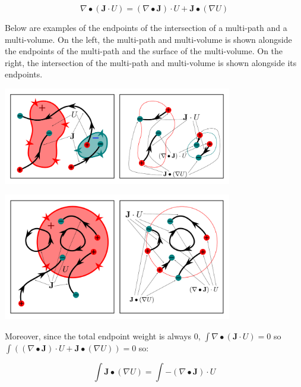 \begin{thm}
\[\nabla \bullet (\mathbf{J} \cdot U) = (\nabla \bullet \mathbf{J}) \cdot U + \mathbf{J} \bullet (\nabla U)\]
\end{thm}

Below are examples of the endpoints of the intersection of a multi-path and a multi-volume. On the left, the multi-path and multi-volume is shown alongside the endpoints of the multi-path and the surface of the multi-volume. On the right, the intersection of the multi-path and multi-volume is shown alongside its endpoints.

\begin{center}
\includegraphics[width = 0.75\textwidth]{Boundaries/Path_endpoints/path_volume_intersection_endpoints}
\end{center}

\begin{center}
\includegraphics[width = 0.75\textwidth]{Boundaries/Path_endpoints/path_volume_intersection_endpoints_2}
\end{center}

Moreover, since the total endpoint weight is always \(0\), \(\int \nabla \bullet (\mathbf{J} \cdot U) = 0\) so \(\int ((\nabla \bullet \mathbf{J}) \cdot U + \mathbf{J} \bullet (\nabla U)) = 0\) so:

\begin{thm}\label{thm:gradient_theorem}
\[\int \mathbf{J} \bullet (\nabla U) = \int -(\nabla \bullet \mathbf{J}) \cdot U\]
\end{thm}

